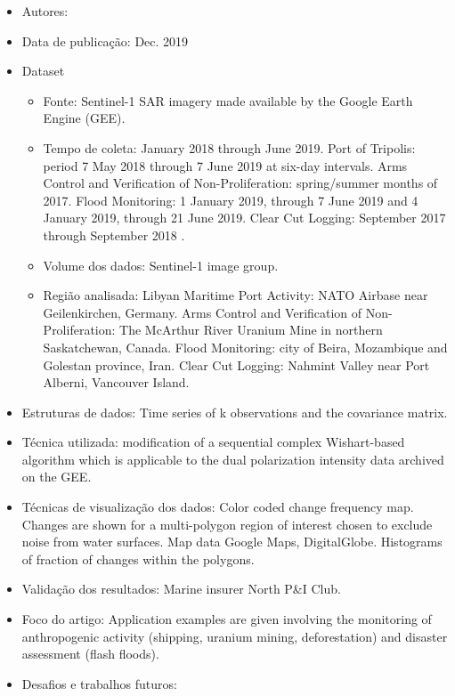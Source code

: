 \documentclass[paper=a4, fontsize=11pt]{scrartcl}
\begin{document}
\begin{itemize}
    \item Autores:~\cite{canty2020statistical}
    \item Data de publicação: Dec. 2019
    \item Dataset
    \begin{itemize}
        \item Fonte: Sentinel-1 SAR imagery made available by the Google Earth Engine (GEE).
        \item Tempo de coleta: January 2018 through June 2019. Port of Tripolis: period 7 May 2018 through 7 June 2019 at six-day intervals. Arms Control and Verification of Non-Proliferation: spring/summer months of 2017. Flood Monitoring: 1 January 2019, through 7 June 2019 and 4 January 2019, through 21 June 2019. Clear Cut Logging: September 2017 through September 2018 .
        \item Volume dos dados: Sentinel-1 image group.
        \item Região analisada: Libyan Maritime Port Activity: NATO Airbase near Geilenkirchen, Germany.  Arms Control and Verification of Non-Proliferation: The McArthur River Uranium Mine in northern Saskatchewan, Canada. Flood Monitoring: city of Beira, Mozambique and  Golestan province, Iran. Clear Cut Logging: Nahmint Valley near Port Alberni, Vancouver Island.
    \end{itemize}
    \item Estruturas de dados: Time series of k observations and the covariance matrix.
    \item Técnica utilizada: modification of a sequential complex Wishart-based algorithm which is applicable to the dual polarization intensity data archived on the GEE.
    \item Técnicas de visualização dos dados: Color coded change frequency map. Changes are shown for a multi-polygon region of interest chosen to exclude noise from water surfaces. Map data Google Maps, DigitalGlobe. Histograms of fraction of changes within the polygons. 
    \item Validação dos resultados: Marine insurer North P\&I Club.
    \item Foco do artigo: Application examples are given involving the monitoring of anthropogenic activity (shipping, uranium mining, deforestation) and disaster assessment (flash floods).
    \item Desafios e trabalhos futuros:
        \begin{itemize}

\end{itemize}
\end{itemize}
\end{document}
